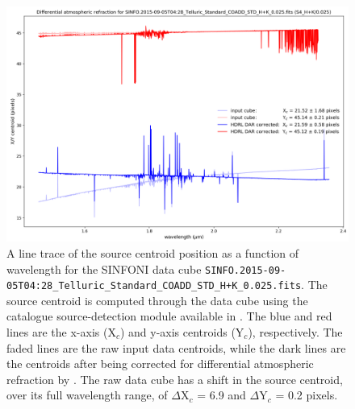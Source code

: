 \begin{figure}[H]
\centering \subfigure
\includegraphics[width=16cm]{figures/SINFO_cube_centroid_corrected.png} 
\caption[]
	{\footnotesize  A line trace of the source centroid position as a function of wavelength for the SINFONI data cube {\tt SINFO.2015-09-05T04:28\_Telluric\_Standard\_COADD\_STD\_H+K\_0.025.fits}.  
	The source centroid is computed through the data cube using the catalogue source-detection module available in \hdrlcat.  
	The blue and red lines are the x-axis  (X$_c$) and y-axis centroids (Y$_c$), respectively.  The faded lines are the raw input data centroids, while the dark lines are the centroids 
	after being corrected for differential atmospheric refraction by \hdrldar.	   The raw data cube has a shift in the source
	centroid, over its full wavelength range, of $\Delta$X$_c$ = 6.9 and $\Delta$Y$_c$ = 0.2 pixels. 
	}
	\label{fig:SINFONI_trace}
\end{figure}


